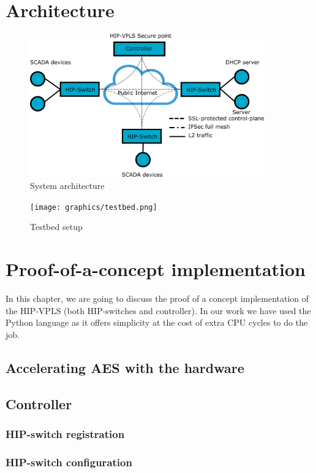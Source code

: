 \chapter{Architecture}

\begin{figure}[h!]
\centering
\includegraphics[width=0.9\textwidth]{graphics/arch.png}
\caption{System architecture}
\label{fig:architecture}
\end{figure}       


\begin{figure}[h!]
\centering
\texttt{[image: graphics/testbed.png]}
\caption{Testbed setup}
\label{fig:testbed}
\end{figure}       
    
\chapter{Proof-of-a-concept implementation}
In this chapter, we are going to discuss the proof of a concept
implementation of the HIP-VPLS (both HIP-switches and controller). 
In our work we have used the Python language as it offers simplicity
at the cost of extra CPU cycles to do the job.

\section{Accelerating AES with the hardware}

\section{Controller}
\subsection{HIP-switch registration}
\subsection{HIP-switch configuration}
